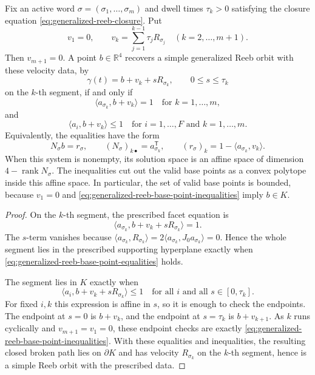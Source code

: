 \begin{lemma}\label{lem:generalized-reeb-base-point-recovery}
Fix an active word \(\sigma=(\sigma_1,\ldots,\sigma_m)\) and dwell times
\(\tau_k>0\) satisfying the closure equation
\eqref{eq:generalized-reeb-closure}. Put
\[
  v_1=0,
  \qquad
  v_k=\sum_{j=1}^{k-1}\tau_jR_{\sigma_j}
  \quad (k=2,\ldots,m+1).
\]
Then \(v_{m+1}=0\). A point \(b\in\mathbb{R}^4\) recovers a simple generalized Reeb orbit
with these velocity data, by
\[
  \gamma(t)=b+v_k+sR_{\sigma_k},
  \qquad 0\leq s\leq \tau_k
\]
on the \(k\)-th segment, if and only if
\begin{equation}\label{eq:generalized-reeb-base-point-equalities}
  \langle a_{\sigma_k}, b+v_k\rangle=1
  \quad\text{for }k=1,\ldots,m,
\end{equation}
and
\begin{equation}\label{eq:generalized-reeb-base-point-inequalities}
  \langle a_i,b+v_k\rangle\leq 1
  \quad\text{for }i=1,\ldots,F\text{ and }k=1,\ldots,m.
\end{equation}
Equivalently, the equalities have the form
\[
  N_\sigma b = r_\sigma,
  \qquad
  (N_\sigma)_{k\bullet}=a_{\sigma_k}^{\mathsf T},
  \qquad
  (r_\sigma)_k=1-\langle a_{\sigma_k},v_k\rangle .
\]
When this system is nonempty, its solution space is an affine space of
dimension \(4-\operatorname{rank}N_\sigma\). The inequalities cut out the
valid base points as a convex polytope inside this affine space. In particular,
the set of valid base points is bounded, because \(v_1=0\) and
\eqref{eq:generalized-reeb-base-point-inequalities} imply \(b\in K\).
\end{lemma}

\begin{proof}
On the \(k\)-th segment, the prescribed facet equation is
\[
  \langle a_{\sigma_k}, b+v_k+sR_{\sigma_k}\rangle=1.
\]
The \(s\)-term vanishes because
\(\langle a_{\sigma_k},R_{\sigma_k}\rangle
=2\langle a_{\sigma_k},J_0a_{\sigma_k}\rangle=0\). Hence the whole segment
lies in the prescribed supporting hyperplane exactly when
\eqref{eq:generalized-reeb-base-point-equalities} holds.

The segment lies in \(K\) exactly when
\[
  \langle a_i,b+v_k+sR_{\sigma_k}\rangle\leq 1
  \quad\text{for all }i\text{ and all }s\in[0,\tau_k].
\]
For fixed \(i,k\) this expression is affine in \(s\), so it is enough to check
the endpoints. The endpoint at \(s=0\) is \(b+v_k\), and the endpoint at
\(s=\tau_k\) is \(b+v_{k+1}\). As \(k\) runs cyclically and \(v_{m+1}=v_1=0\),
these endpoint checks are exactly
\eqref{eq:generalized-reeb-base-point-inequalities}. With these equalities and
inequalities, the resulting closed broken path lies on \(\partial K\) and has
velocity \(R_{\sigma_k}\) on the \(k\)-th segment, hence is a simple Reeb orbit
with the prescribed data.
\end{proof}

